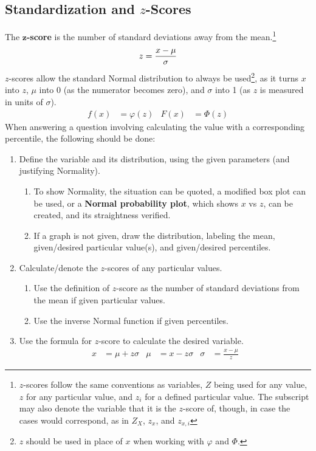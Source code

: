 \documentclass[../AP_Statistics.tex]{subfiles}
\begin{document}
			\subsection*{Standardization and $z$-Scores}
				The $\pmb{z}$\textbf{-score} is the number of standard deviations away from the mean.\footnote{$z$-scores follow the same conventions as variables, $Z$ being used for any value, $z$ for any particular value, and $z_i$ for a defined particular value. The subscript may also denote the variable that it is the $z$-score of, though, in case the cases would correspond, as in $Z_X$, $z_x$, and $z_{x,i}$}
				\[z = \frac{x - \mu}{\sigma}\]
				$z$-scores allow the standard Normal distribution to always be used\footnote{$z$ should be used in place of $x$ when working with $\varphi$ and $\Phi$.}, as it turns $x$ into $z$, $\mu$ into 0 (as the numerator becomes zero), and $\sigma$ into 1 (as $z$ is measured in units of $\sigma$).
				\begin{align*}
					f(x) &= \varphi(z) & F(x) &= \Phi(z)
				\end{align*}
				When answering a question involving calculating the value with a corresponding percentile, the following should be done:
				\begin{enumerate}
					\item Define the variable and its distribution, using the given parameters (and justifying Normality).
					\begin{enumerate}
						\item To show Normality, the situation can be quoted, a modified box plot can be used, or a \textbf{Normal probability plot}, which shows $x$ vs $z$, can be created, and its straightness verified.
						\item If a graph is not given, draw the distribution, labeling the mean, given/desired particular value(s), and given/desired percentiles.
					\end{enumerate}
					\item Calculate/denote the $z$-scores of any particular values.
					\begin{enumerate}
						\item Use the definition of $z$-score as the number of standard deviations from the mean if given particular values.
						\item Use the inverse Normal function if given percentiles.
					\end{enumerate}
					\item Use the formula for $z$-score to calculate the desired variable.
						\begin{align*}
							x &= \mu + z\sigma & \mu &= x - z\sigma & \sigma &= \frac{x - \mu}{z}
						\end{align*}
				\end{enumerate}
\end{document}

